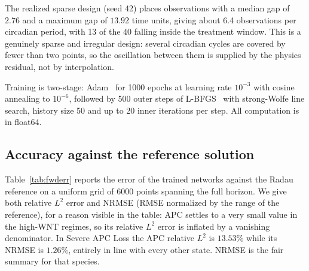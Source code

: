 \documentclass[11pt]{article}
\begin{document}
The realized sparse design (seed 42) places observations with a median gap of
$2.76$ and a maximum gap of $13.92$ time units, giving about 6.4 observations
per circadian period, with 13 of the 40 falling inside the treatment window.
This is a genuinely sparse and irregular design: several circadian cycles are
covered by fewer than two points, so the oscillation between them is supplied
by the physics residual, not by interpolation.

Training is two-stage: Adam~\citep{kingma2015adam} for 1000 epochs at learning
rate $10^{-3}$ with cosine annealing to $10^{-6}$, followed by 500 outer steps
of L-BFGS~\citep{liu1989lbfgs} with strong-Wolfe line search, history size 50
and up to 20 inner iterations per step. All computation is in float64.

\subsection{Accuracy against the reference solution}

Table~\ref{tab:fwderr} reports the error of the trained networks against the
Radau reference on a uniform grid of 6000 points spanning the full horizon. We
give both relative $L^2$ error and NRMSE (RMSE normalized by the range of the
reference), for a reason visible in the table: APC settles to a very small
value in the high-WNT regimes, so its relative $L^2$ error is inflated by a
vanishing denominator. In Severe APC Loss the APC relative $L^2$ is $13.53\%$
while its NRMSE is $1.26\%$, entirely in line with every other state. NRMSE is
the fair summary for that species.
\end{document}
